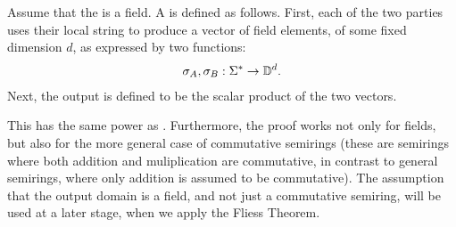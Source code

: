 \begin{definition} \label{def:scalar-product-protocol}
    Assume that the  is a field.
    A  is defined as follows.
    First, each of the two parties uses their local string to 
    produce a vector of field elements, 
    of some fixed dimension $d$, as expressed by two functions: 
    \begin{align*}
    \sigma_A, \sigma_B : \Sigma^* \to \mathbb D^d.
    \end{align*}
    Next, the output is defined to be the scalar product of the two vectors. 
\end{definition}

This  has the same power as . Furthermore, the proof works not only for fields, but also for the more general case of commutative semirings (these are semirings where both addition and muliplication are commutative, in contrast to general semirings, where only addition is assumed to be commutative). The assumption that the output domain is a field, and not just a commutative semiring, will be used at a later stage, when we apply the Fliess Theorem.

